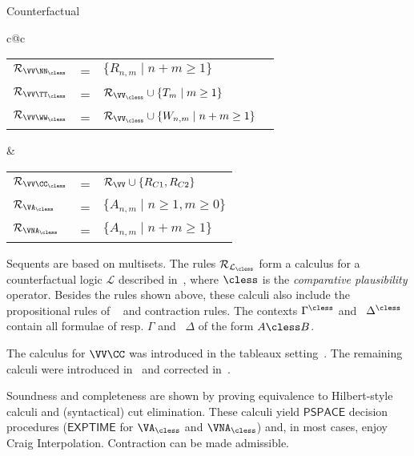 \begin{entry}{Counterfactual}
\begin{calculus}
\begin{small}
\begin{center}
\begin{tabular}{c@{\qquad}c}
  \\
\begin{tabular}{lll}
$\Rules_{\VV\NN_\cless}$ & = & $\{ R_{n,m} \mid n+m \geq 1\}$\\
$\Rules_{\VV\TT_\cless}$ & = & $\Rules_{\VV_\cless}\cup \{T_m \mid m \geq 1\}$\\
$\Rules_{\VV\WW_\cless}$ & = &$\Rules_{\VV_\cless}\cup \{W_{n,m}\mid n
+ m \geq 1\}\quad$
\end{tabular} &
\begin{tabular}{lll}
$\Rules_{\VV\CC_\cless}$ & = & $\Rules_\VV\cup\{R_{C1},R_{C2}\}$\\
$\Rules_{\VA_\cless}$ & = & $\{ A_{n,m} \mid n\geq 1, m\geq 0 \}$\\
$\Rules_{\VNA_\cless}$ & = & $\{ A_{n,m} \mid n + m\geq 1 \}$
\end{tabular}
\end{tabular}
\end{center}

\end{small}
\end{calculus}


\begin{clarifications}
  Sequents are based on multisets. The rules $\Rules_{\mathcal{L}_\cless}$ 
  form a calculus for a counterfactual logic $\mathcal{L}$ described 
  in~\cite{Lewis:1973uq}, where $\cless$ is the \emph{comparative plausibility} 
  operator. Besides the rules shown above, these calculi also include the 
  propositional rules of
  \Gtc~ and contraction rules. The contexts $\Gamma^\cless$ and \
  $\Delta^\cless$ contain all formulae of resp. $\Gamma$ and \ $\Delta$ of
  the form $A \cless B$.
\end{clarifications}

\begin{history}
  The calculus for $\VV\CC$ was introduced in the tableaux
  setting~\cite{Swart:1983uq,Gent:1992p3090}. The remaining calculi were
  introduced in~\cite{Lellmann:2012fk,Lellmann:2013fk} and corrected
  in~\cite{Lellmann:2013}.
\end{history}

\begin{technicalities}
  Soundness and completeness are shown by proving equivalence to 
  Hilbert-style calculi and (syntactical) cut elimination. 
  These calculi yield $\mathsf{PSPACE}$ decision
  procedures ($\mathsf{EXPTIME}$ for $\VA_\cless$ and
  $\VNA_\cless$) and, in most cases, enjoy Craig Interpolation. 
  Contraction can be made admissible. %
\end{technicalities}

\vspace{-5pt}

\end{entry}

